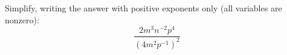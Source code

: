 Simplify, writing the answer with positive exponents only (all variables are nonzero):
\[
\dfrac{2m^3n^{-2}p^4}{(4m^2p^{-1})^2}
\]

